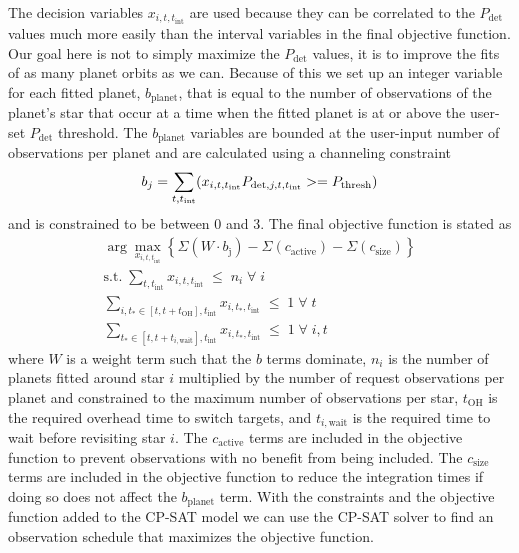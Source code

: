 The decision variables $x_{i, t, t_{\textrm{int}}}$ are used because they can
be correlated to the $P_\textrm{det}$ values much more easily than the interval
variables in the final objective function. Our goal here is not to simply
maximize the $P_\textrm{det}$ values, it is to improve the fits of as many
planet orbits as we can. Because of this we set up an integer variable for each
fitted planet, $b_\textrm{planet}$, that is equal to the number of observations
of the planet's star that occur at a time when the fitted planet is at or above
the user-set $P_\textrm{det}$ threshold. The $b_\textrm{planet}$ variables are
bounded at the user-input number of observations per planet and are calculated
using a channeling constraint
\begin{equation}
  b_j = \sum_{t, t_\textrm{int}}(x_{i, t, t_\textrm{int}}P_{\textrm{det}, j, t, t_\textrm{int}} >= P_\textrm{thresh})\\
  \label{eq:bplanet}
\end{equation}
and is constrained to be between 0 and 3. The final objective function is stated as 
\begin{gather}
  \arg\max_{x_{i,t,t_\textrm{int}}}{\left\{ \Sigma\left(W \cdot
  b_\textrm{j}\right) - \Sigma\left( c_\textrm{active}\right) - \Sigma\left(
  c_\textrm{size}\right) \right\}}\\
  \textrm{s.t.} \; \sum_{t,t_\textrm{int}} x_{i,t,t_\textrm{int}} \; \leq \; n_i \; \forall \; i\\
  \sum_{i, t_*\in[t,t+t_\textrm{OH}], t_\textrm{int}} x_{i,t_*,t_\textrm{int}} \; \leq \; 1 \; \forall \; t\\
  \sum_{t_*\in[t,t+t_{i,\textrm{wait}}], t_\textrm{int}} x_{i,t_*,t_\textrm{int}} \; \leq \; 1 \; \forall \; i, t
 \label{eq:final_obj_function}
\end{gather}
where $W$ is a weight term such that the $b$ terms dominate, $n_i$ is the
number of planets fitted around star $i$ multiplied by the number of request
observations per planet and constrained to the maximum number of observations
per star, $t_\textrm{OH}$ is the required overhead time to switch targets, and
$t_{i,\textrm{wait}}$ is the required time to wait before revisiting star $i$.
The $c_\textrm{active}$ terms are included in the objective function to prevent
observations with no benefit from being included. The $c_\textrm{size}$ terms
are included in the objective function to reduce the integration times if doing
so does not affect the $b_\textrm{planet}$ term. With the constraints and the
objective function added to the CP-SAT model we can use the CP-SAT solver to
find an observation schedule that maximizes the objective function.


